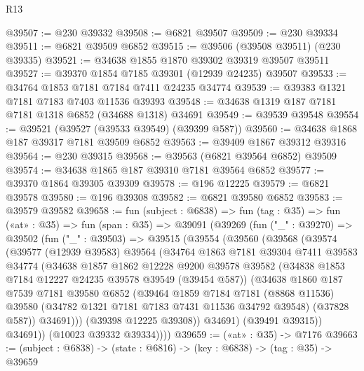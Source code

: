 \begin{lexlean}{R13}
\begin{coremodule}
@39507 := @230 @39332
@39508 := @6821 @39507
@39509 := @230 @39334
@39511 := @6821 @39509 @6852
@39515 := @39506 (@39508 @39511) (@230 @39335)
@39521 := @34638 @1855 @1870 @39302 @39319 @39507 @39511
@39527 := @39370 @1854 @7185 @39301 (@12939 @24235) @39507
@39533 := @34764 @1853 @7181 @7184 @7411 @24235 @34774
@39539 := @39383 @1321 @7181 @7183 @7403 @11536 @39393
@39548 := @34638 @1319 @187 @7181 @7181 @1318 @6852 (@34688 @1318) @34691
@39549 := @39539 @39548
@39554 := @39521 (@39527 (@39533 @39549) (@39399 @587))
@39560 := @34638 @1868 @187 @39317 @7181 @39509 @6852
@39563 := @39409 @1867 @39312 @39316
@39564 := @230 @39315
@39568 := @39563 (@6821 @39564 @6852) @39509
@39574 := @34638 @1865 @187 @39310 @7181 @39564 @6852
@39577 := @39370 @1864 @39305 @39309
@39578 := @196 @12225
@39579 := @6821 @39578
@39580 := @196 @39308
@39582 := @6821 @39580 @6852
@39583 := @39579 @39582
@39658 := fun (subject : @6838) =>
  fun (tag : @35) =>
  fun («at» : @35) =>
  fun (span : @35) =>
  @39091
    (@39269
      (fun ("_" : @39270) =>
      @39502
        (fun ("_" : @39503) =>
        @39515
          (@39554
            (@39560
              (@39568
                (@39574
                  (@39577
                    (@12939 @39583)
                    @39564
                    (@34764
                      @1863
                      @7181
                      @39304
                      @7411
                      @39583
                      @34774
                      (@34638
                        @1857
                        @1862
                        @12228
                        @9200
                        @39578
                        @39582
                        (@34838 @1853 @7184 @12227 @24235 @39578 @39549 (@39454 @587))
                        (@34638
                          @1860
                          @187
                          @7539
                          @7181
                          @39580
                          @6852
                          (@39464
                            @1859
                            @7184
                            @7181
                            (@8868 @11536)
                            @39580
                            (@34782 @1321 @7181 @7183 @7431 @11536 @34792 @39548)
                            (@37828 @587))
                          @34691)))
                    (@39398 @12225 @39308))
                  @34691)
                (@39491 @39315))
              @34691))
          (@10023 @39332 @39334))))
@39659 := («at» : @35) -> @7176
@39663 := (subject : @6838) -> (state : @6816) -> (key : @6838) -> (tag : @35) -> @39659

\end{coremodule}
\end{lexlean}
